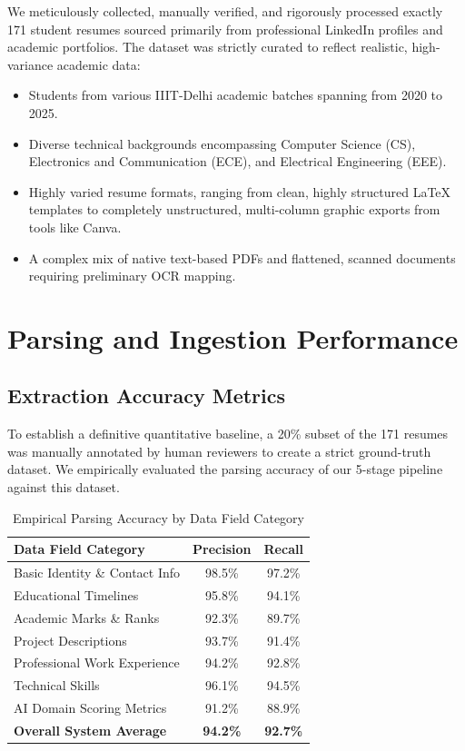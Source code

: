 \documentclass[12pt,a4paper]{report}
\begin{document}
We meticulously collected, manually verified, and rigorously processed exactly 171 student resumes sourced primarily from professional LinkedIn profiles and academic portfolios. The dataset was strictly curated to reflect realistic, high-variance academic data:
\begin{itemize}
    \item Students from various IIIT-Delhi academic batches spanning from 2020 to 2025.
    \item Diverse technical backgrounds encompassing Computer Science (CS), Electronics and Communication (ECE), and Electrical Engineering (EEE).
    \item Highly varied resume formats, ranging from clean, highly structured LaTeX templates to completely unstructured, multi-column graphic exports from tools like Canva.
    \item A complex mix of native text-based PDFs and flattened, scanned documents requiring preliminary OCR mapping.
\end{itemize}

\section{Parsing and Ingestion Performance}

\subsection{Extraction Accuracy Metrics}

To establish a definitive quantitative baseline, a 20\% subset of the 171 resumes was manually annotated by human reviewers to create a strict ground-truth dataset. We empirically evaluated the parsing accuracy of our 5-stage pipeline against this dataset.

\begin{table}[H]
\centering
\begin{tabular}{lcc}
\toprule
\textbf{Data Field Category} & \textbf{Precision} & \textbf{Recall} \\
\midrule
Basic Identity \& Contact Info & 98.5\% & 97.2\% \\
Educational Timelines & 95.8\% & 94.1\% \\
Academic Marks \& Ranks & 92.3\% & 89.7\% \\
Project Descriptions & 93.7\% & 91.4\% \\
Professional Work Experience & 94.2\% & 92.8\% \\
Technical Skills & 96.1\% & 94.5\% \\
AI Domain Scoring Metrics & 91.2\% & 88.9\% \\
\bottomrule
\textbf{Overall System Average} & \textbf{94.2\%} & \textbf{92.7\%} \\
\bottomrule
\end{tabular}
\caption{Empirical Parsing Accuracy by Data Field Category}
\label{tab:parsing-accuracy}
\end{table}
\end{document}

